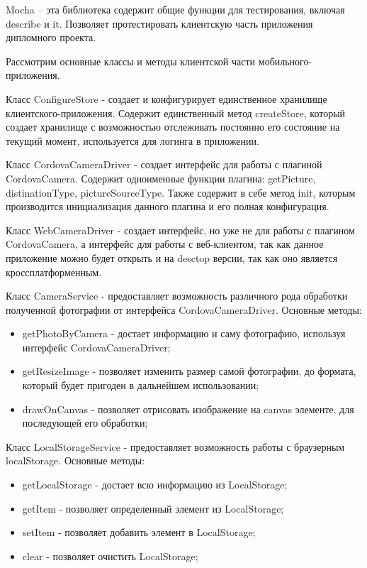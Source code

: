 Mocha – эта библиотека содержит общие функции для тестирования, включая describe и it. Позволяет протестировать клиентскую часть приложения дипломного проекта.

Рассмотрим основные классы и методы клиентской части мобильного-приложения.

Класс ConfigureStore - создает и конфигурирует единственное хранилище клиентского-приложения. Содержит единственный метод createStore, который создает хранилище с возможностью отслеживать постоянно его состояние на текущий момент, используется для логинга в приложении.

Класс CordovaCameraDriver - создает интерфейс для работы с плагиной CordovaCamera. Содержит одноименные функции плагина: getPicture, distinationType, pictureSourceType. Также содержит в себе метод init, которым производится инициализация данного плагина и его полная конфигурация.

Класс WebCameraDriver - создает интерфейс, но уже не для работы с плагином CordovaCamera, а интерфейс для работы с веб-клиентом, так как данное приложение можно будет открыть и на desctop версии, так как оно является кроссплатформенным.

Класс CameraService - предоставляет возможность различного рода обработки полученной фотографии от интерфейса CordovaCameraDriver. Основные методы:
\begin{itemize}
  \item getPhotoByCamera - достает информацию и саму фотографию, используя интерфейс CordovaCameraDriver;
  \item getResizeImage - позволяет изменить размер самой фотографии, до формата, который будет пригоден в дальнейшем использовании;
  \item drawOnCanvas - позволяет отрисовать изображение на canvas элементе, для последующей его обработки;
\end{itemize}

Класс LocalStorageService - предоставляет возможность работы с браузерным localStorage. Основные методы:
\begin{itemize}
  \item getLocalStorage - достает всю информацию из LocalStorage;
  \item getItem - позволяет определенный элемент из LocalStorage;
  \item setItem - позволяет добавить элемент в LocalStorage;
  \item clear - позволяет очистить LocalStorage;
\end{itemize}

